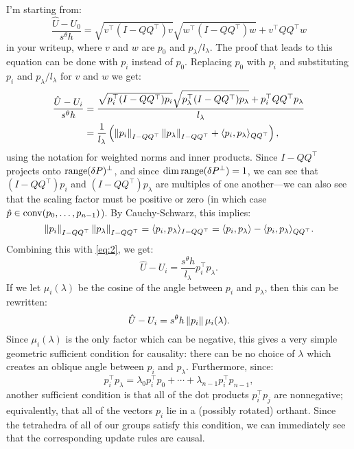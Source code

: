 \documentclass[eikonal.tex]{subfiles}
\begin{document}
I'm starting from:
\begin{equation}
  \frac{\hat{U} - U_0}{s^\theta h} = \sqrt{v^\top(I - QQ^\top)v} \sqrt{w^\top(I - QQ^\top)w} + v^\top QQ^\top w
\end{equation}
in your writeup, where $v$ and $w$ are $p_0$ and
$p_\lambda/l_\lambda$. The proof that leads to this equation can be
done with $p_i$ instead of $p_0$. Replacing $p_0$ with $p_i$ and
substituting $p_i$ and $p_\lambda/l_\lambda$ for $v$ and $w$ we get:
\begin{equation}
  \begin{split}\label{eq:2}
    \frac{\hat{U} - U_i}{s^\theta h} &= \frac{\sqrt{p_i^\top(I - QQ^\top)p_i} \sqrt{p_\lambda^\top(I - QQ^\top)p_\lambda} + p_i^\top QQ^\top p_\lambda}{l_\lambda} \\
    &= \frac{1}{l_\lambda} \left(\left\|p_i\right\|_{I - QQ^\top} \left\|p_\lambda\right\|_{I - QQ^\top} + \langle p_i, p_\lambda \rangle_{QQ^\top}\right),
  \end{split}
\end{equation}
using the notation for weighted norms and inner products. Since
$I - QQ^\top$ projects onto $\operatorname{range}(\delta P)^\perp$, and since
$\dim \operatorname{range}(\delta P^\perp) = 1$, we can see that $(I - QQ^\top)p_i$
and $(I - QQ^\top)p_\lambda$ are multiples of one another---we can
also see that the scaling factor must be positive or zero (in which
case $\hat{p} \in \operatorname{conv}(p_0, \hdots, p_{n-1})$). By Cauchy-Schwarz,
this implies:
\begin{equation}
  \left\|p_i\right\|_{I - QQ^\top} \left\|p_\lambda\right\|_{I - QQ^\top} = \langle p_i, p_\lambda \rangle_{I - QQ^\top} = \langle p_i, p_\lambda \rangle - \langle p_i, p_\lambda \rangle_{QQ^\top}.
\end{equation}
Combining this with \cref{eq:2}, we get:
\begin{equation}
  \hat{U} - U_i = \frac{s^\theta h}{l_\lambda} p_i^\top p_\lambda.
\end{equation}
If we let $\mu_i(\lambda)$ be the cosine of the angle between $p_i$ and
$p_\lambda$, then this can be rewritten:
\begin{equation}
  \hat{U} - U_i = s^\theta h \left\|p_i\right\| \mu_i(\lambda).
\end{equation}
Since $\mu_i(\lambda)$ is the only factor which can be negative, this
gives a very simple geometric sufficient condition for causality:
there can be no choice of $\lambda$ which creates an oblique angle
between $p_i$ and $p_\lambda$. Furthermore, since:
\begin{equation}
  p_i^\top p_\lambda = \lambda_0 p_i^\top p_0 + \cdots + \lambda_{n-1} p_i^\top p_{n-1},
\end{equation}
another sufficient condition is that all of the dot products
$p_i^\top p_j$ are nonnegative; equivalently, that all of the vectors
$p_i$ lie in a (possibly rotated) orthant. Since the tetrahedra of all
of our groups satisfy this condition, we can immediately see that the
corresponding update rules are causal.
\end{document}
